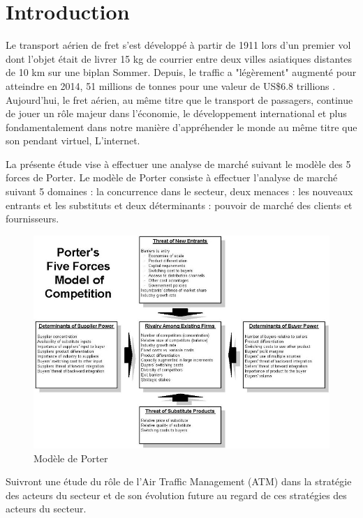 
\pagebreak

\section{Introduction}

Le transport aérien de fret s'est développé à partir de 1911 lors d'un
premier vol dont l'objet était de livrer 15 kg de courrier entre deux villes asiatiques distantes de 10 km sur une biplan Sommer. Depuis, le traffic a "légèrement" augmenté pour atteindre en 2014, 51 millions de tonnes pour une valeur de US\$6.8 trillions \cite{RePEc:eee:jaitra:v:61:y:2017:i:c:p:34-40}.
Aujourd'hui, le fret aérien, au même titre que le transport de passagers, continue de jouer un rôle majeur dans l'économie, le développement international et plus fondamentalement dans notre manière d'appréhender le monde au même titre que son pendant virtuel, L'internet. 


La présente étude vise à effectuer une analyse de marché suivant le modèle des 5 forces de Porter.
Le modèle de Porter consiste à effectuer l'analyse de marché suivant 5 domaines :
la concurrence dans le secteur, deux menaces : les nouveaux entrants et les substituts et deux déterminants : pouvoir de marché des clients et fournisseurs.

\begin{figure}[H]
	\begin{center}
		\includegraphics[scale=0.48]{images/porter/porter_1}
		\caption{Modèle de Porter}
		\label{inclusion}
	\end{center}
\end{figure}


Suivront une étude du rôle de l'Air Traffic Management (ATM) dans la stratégie des acteurs du secteur et de son évolution future au regard de ces stratégies des acteurs du secteur. 
   



